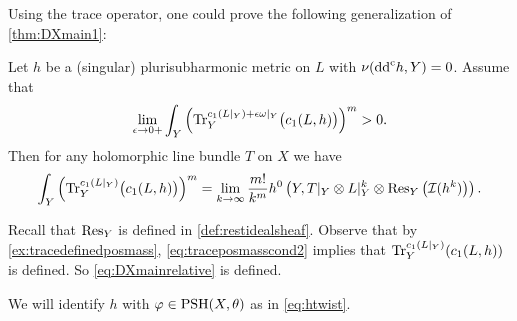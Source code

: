 Using the trace operator, one could prove the following generalization of \cref{thm:DXmain1}:
\begin{theorem}\label{thm:rest_volume}
Let $h$ be a (singular) plurisubharmonic metric on $L$ with $\nu(\mathrm{dd}^{\mathrm{c}} h,Y)=0$. Assume that
\begin{equation}\label{eq:traceposmasscond2}
    \lim_{\epsilon\to 0+} \int_Y\left(\operatorname{Tr}_Y^{c_1(L|_Y)+\epsilon\omega|_Y}\bigl(c_1(L,h)\bigr) \right)^m>0.
\end{equation}
Then for any holomorphic line bundle $T$ on $X$ we have
\begin{equation}\label{eq:DXmainrelative}
    \int_Y \left(\operatorname{Tr}_Y^{c_1(L|_Y)}\bigl(c_1(L,h)\bigr)\right)^m = \lim_{k \to \infty} \frac{m!}{k^m} h^0\left(Y,T|_Y\otimes L|_Y^k \otimes \operatorname{Res}_Y\left(\mathcal{I}(h^{k})\right) \right).
\end{equation}
\end{theorem}
Recall that $\operatorname{Res}_Y$ is defined in \cref{def:restidealsheaf}. Observe that by \cref{ex:tracedefinedposmass}, \eqref{eq:traceposmasscond2} implies that $\operatorname{Tr}_Y^{c_1(L|_Y)}(c_1(L,h))$ is defined. So \eqref{eq:DXmainrelative} is defined.

We will identify $h$ with $\varphi\in \mathrm{PSH}(X,\theta)$ as in \eqref{eq:htwist}.

